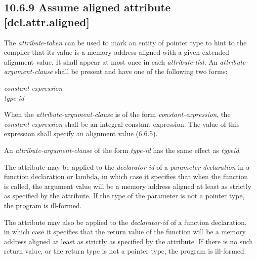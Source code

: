 \begin{addedblock}
\subsection*{10.6.9 Assume aligned attribute \hspace{6.22cm} [dcl.attr.aligned]}

\pnum
The \textit{attribute-token}  can be used to mark an entity of pointer type to hint to the compiler that its value is a memory address aligned with a given extended alignment value. It shall appear at most once in each \textit{attribute-list}. An \textit{attribute-argument-clause} shall be present and have one of the following two forms:

\tcode{( }\textit{constant-expression}\tcode{ )} \\
\tcode{( }\textit{type-id}\tcode{ )}

\pnum
When the \textit{attribute-argument-clause} is of the form \tcode{( }\textit{constant-expression}\tcode{ )}, the \textit{constant-expression} shall be an integral constant expression. The value of this expression shall specify an alignment value (6.6.5).

\pnum
An \textit{attribute-argument-clause} of the form \tcode{( }\textit{type-id}\tcode{ )} has the same effect as  \textit{typeid}\tcode{ ))}.

\pnum
The  attribute may be applied to the \textit{declarator-id} of a \textit{parameter-declaration} in a function declaration or lambda, in which case it specifies that when the function is called, the argument value will be a memory address aligned at least as strictly as specified by the attribute. If the type of the parameter is not a pointer type, the program is ill-formed.

\pnum
The  attribute may also be applied to the \textit{declarator-id} of a function declaration, in which case it specifies that the return value of the function will be a memory address aligned at least as strictly as specified by the attribute. If there is no such return value, or the return type is not a pointer type, the program is ill-formed.


\end{addedblock}
